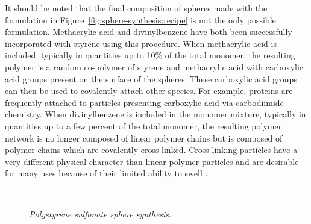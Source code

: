 It should be noted that the final composition of spheres made with the formulation in Figure~\ref{fig:sphere-synthesis:recipe} is not the only possible formulation.
Methacrylic acid and divinylbenzene have both been successfully incorporated with styrene using this procedure.
When methacrylic acid is included, typically in quantities up to 10\% of the total monomer, the resulting polymer is a random co-polymer of styrene and methacrylic acid with carboxylic acid groups present on the surface of the spheres.
These carboxylic acid groups can then be used to covalently attach other species.
For example, proteins are frequently attached to particles presenting carboxylic acid via carbodiimide chemistry.
When divinylbenzene is included in the monomer mixture, typically in quantities up to a few percent of the total monomer, the resulting polymer network is no longer composed of linear polymer chains but is composed of polymer chains which are covalently cross-linked.
Cross-linking particles have a very different physical character than linear polymer particles and are desirable for many uses because of their limited ability to swell \cite{Sheu:1990}.

\begin{figure}[htbp]
\centering
	\\
\caption{\label{fig:sphere-synthesis}\emph{Polystyrene sulfonate sphere synthesis.}}
\end{figure}


